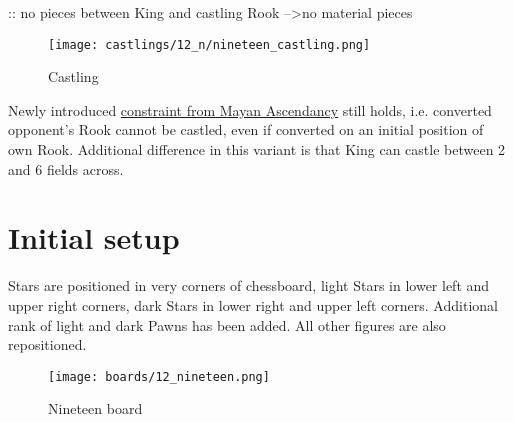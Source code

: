 \TODO :: no pieces between King and castling Rook --\textgreater no material pieces

\vspace*{-0.7\baselineskip}
\noindent
\begin{figure}[!h]
\texttt{[image: castlings/12\_n/nineteen\_castling.png]}
\vspace*{-1.3\baselineskip}
\caption{Castling}
\label{fig:nineteen_castling}
\end{figure}

\vspace*{-0.7\baselineskip}
Newly introduced
\hyperref[sec:Mayan Ascendancy/Pyramid/Conversion/Converting Rooks]{constraint from Mayan Ascendancy}
still holds, i.e. converted opponent's Rook cannot be castled, even if converted on
an initial position of own Rook. Additional difference in this variant is that King
can castle between 2 and 6 fields across.

\clearpage %

\section*{Initial setup}
\label{sec:Nineteen/Initial setup}

Stars are positioned in very corners of chessboard, light Stars in lower left and upper right
corners, dark Stars in lower right and upper left corners. Additional rank of light and dark
Pawns has been added. All other figures are also repositioned.

\noindent
\begin{figure}[h]
\texttt{[image: boards/12\_nineteen.png]}
\caption{Nineteen board}
\label{fig:12_nineteen}
\end{figure}

\clearpage %
